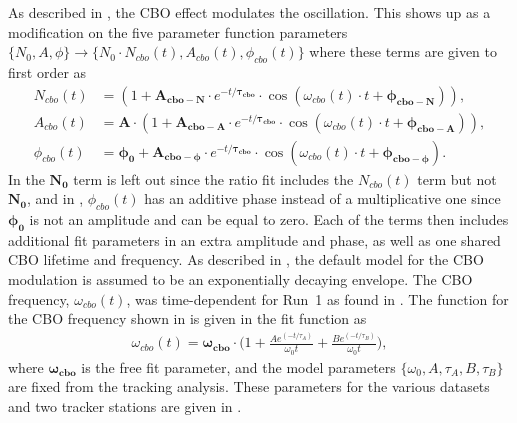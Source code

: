 As described in , the CBO effect modulates the \wa oscillation. This shows up as a modification on the five parameter function parameters $\{N_{0}, A, \phi\} \rightarrow \{N_{0} \cdot N_{cbo}(t), A_{cbo}(t), \phi_{cbo}(t)\}$ where these terms are given to first order as
    \begin{align}
        N_{cbo}(t) &= (1 + \boldsymbol{A_{cbo-N}} \cdot e^{-t/\boldsymbol{\tau_{cbo}}} \cdot \cos(\omega_{cbo}(t) \cdot t + \boldsymbol{\phi_{cbo-N}})), \label{eq:Ncbo} \\ 
        A_{cbo}(t) &= \boldsymbol{A} \cdot (1 + \boldsymbol{A_{cbo-A}} \cdot e^{-t/\boldsymbol{\tau_{cbo}}} \cdot \cos(\omega_{cbo}(t) \cdot t + \boldsymbol{\phi_{cbo-A}})), \label{eq:Acbo} \\ 
        \phi_{cbo}(t) &= \boldsymbol{\phi_{0}} + \boldsymbol{A_{cbo-\phi}} \cdot e^{-t/\boldsymbol{\tau_{cbo}}} \cdot \cos(\omega_{cbo}(t) \cdot t + \boldsymbol{\phi_{cbo-\phi}}). \label{eq:Phicbo}
    \end{align}
In  the $\boldsymbol{N_{0}}$ term is left out since the ratio fit includes the $N_{cbo}(t)$ term but not $\boldsymbol{N_{0}}$, and in , $\phi_{cbo}(t)$ has an additive phase instead of a multiplicative one since $\boldsymbol{\phi_{0}}$ is not an amplitude and can be equal to zero. Each of the terms then includes additional fit parameters in an extra amplitude and phase, as well as one shared CBO lifetime and frequency. As described in , the default model for the CBO modulation is assumed to be an exponentially decaying envelope. The CBO frequency, $\omega_{cbo}(t)$, was time-dependent for Run~1 as found in . The function for the CBO frequency shown in  is given in the fit function as
    \begin{align} \label{eq:CBOfreqForm}
        \omega_{cbo}(t) = \boldsymbol{\omega_{cbo}} \cdot \Big(1 + \frac{Ae^{(-t/\tau_{A})}}{\omega_{0}t} + \frac{Be^{(-t/\tau_{B})}}{\omega_{0}t}\Big),
    \end{align}
where $\boldsymbol{\omega_{cbo}}$ is the free fit parameter, and the model parameters $\{\omega_{0}, A, \tau_{A}, B, \tau_{B}\}$ are fixed from the tracking analysis. These parameters for the various datasets and two tracker stations are given in . 



